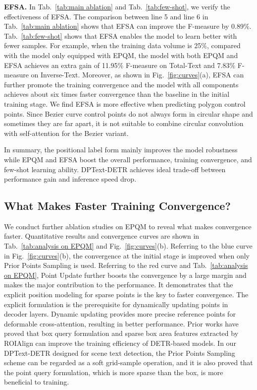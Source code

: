 \documentclass[letterpaper]{article} \usepackage{aaai23}  \usepackage{times}  \usepackage{helvet}  \usepackage{courier}  \usepackage[hyphens]{url}  \usepackage{graphicx} \urlstyle{rm}
\begin{document}
\textbf{EFSA.} In Tab.~\ref{tab:main ablation} and Tab.~\ref{tab:few-shot}, we verify the effectiveness of EFSA. The comparison between line 5 and line 6 in Tab.~\ref{tab:main ablation} shows that EFSA can improve the F-measure by 0.89$\%$.
Tab.~\ref{tab:few-shot} shows that EFSA enables the model to learn better with fewer samples. For example, when the training data volume is 25$\%$, compared with the model only equipped with EPQM, the model with both EPQM and EFSA achieves an extra gain of 11.95$\%$ F-measure on Total-Text and 7.83$\%$ F-measure on Inverse-Text. Moreover, as shown in Fig.~\ref{fig:curves}(a), EFSA can further promote the training convergence and the model with all components achieves about six times faster convergence than the baseline in the initial training stage. We find EFSA is more effective when predicting polygon control points. Since Bezier curve control points do not always form in circular shape and sometimes they are far apart, it is not suitable to combine circular convolution with self-attention for the Bezier variant.

In summary, the positional label form mainly improves the model robustness while EPQM and EFSA boost the overall performance, training convergence, and few-shot learning ability. DPText-DETR achieves ideal trade-off between performance gain and inference speed drop. 

\subsection{What Makes Faster Training Convergence?}
We conduct further ablation studies on EPQM to reveal what makes convergence faster. Quantitative results and convergence curves are shown in Tab.~\ref{tab:analysis on EPQM} and Fig.~\ref{fig:curves}(b). Referring to the blue curve in Fig.~\ref{fig:curves}(b), the convergence at the initial stage is improved when only Prior Points Sampling is used. Referring to the red curve and Tab.~\ref{tab:analysis on EPQM}, Point Update further boosts the convergence by a large margin and makes the major contribution to the performance. It demonstrates that the explicit position modeling for sparse points is the key to faster convergence. The explicit formulation is the prerequisite for dynamically updating points in decoder layers. Dynamic updating provides more precise reference points for deformable cross-attention, resulting in better performance. Prior works \cite{liu2022dabdetr,wang2022towards} have proved that box query formulation and sparse box area features extracted by ROIAlign can improve the training efficiency of DETR-based models. In our DPText-DETR designed for scene text detection, the Prior Points Sampling scheme can be regarded as a soft grid-sample operation, and it is also proved that the point query formulation, which is more sparse than the box, is more beneficial to training. 
\end{document}
